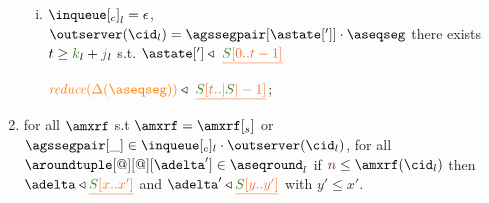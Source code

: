 \begin{definition}
\begin{enumerate}
\begin{enumerate}[i.]
     \item ${\inclient}_l = \epsilon$,  $\outserver(\cid_l) = \agssegpair[{\astate[']}]\cdot \aseqseg$ there exists $t \geq \tknown_l+\treceivebuffer_l $ s.t.
		      $\astate['] \triangleleft \ \flatten{\queuemessage[0 .. t - 1]}$ %
     
       		$\ireduce{\igetdeltas{\aseqseg}}\triangleleft \ \flatten{ \queuemessage[t..|\queuemessage| - 1]}$;
    \end{enumerate}	
	
        \item \label{prop_deltas} for all $\amxrf$ s.t $\amxrf = \amxrf[_s]$ or $\agssegpair[\_]\in\inclient_l\cdot\outserver(\cid_l)$, %
		for all $\aroundtuple[@][@][\adelta'] \in\pending_l$
        if $\irounds\leq\amxrf(\cid_l)$ then $\adelta\triangleleft \flatten{\queuemessage[x..x']}$ and  $\adelta'\triangleleft \flatten{\queuemessage[y..y']}$
        with $y'\leq x'$.

\end{enumerate}
	
\end{definition}


